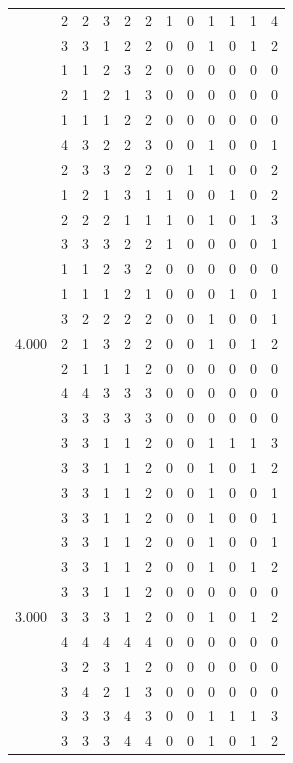 \documentclass[]{book}
\theoremstyle{definition}
\theoremstyle{definition}
\theoremstyle{definition}
\theoremstyle{remark}
\begin{document}
\begin{table}
{\begin{tabular}[t]{rrrrrrrrrrrr}
 & 2 & 2 & 3 & 2 & 2 & 1 & 0 & 1 & 1 & 1 & 4\\
 & 3 & 3 & 1 & 2 & 2 & 0 & 0 & 1 & 0 & 1 & 2\\
 & 1 & 1 & 2 & 3 & 2 & 0 & 0 & 0 & 0 & 0 & 0\\
 & 2 & 1 & 2 & 1 & 3 & 0 & 0 & 0 & 0 & 0 & 0\\
 & 1 & 1 & 1 & 2 & 2 & 0 & 0 & 0 & 0 & 0 & 0\\
 & 4 & 3 & 2 & 2 & 3 & 0 & 0 & 1 & 0 & 0 & 1\\
 & 2 & 3 & 3 & 2 & 2 & 0 & 1 & 1 & 0 & 0 & 2\\
 & 1 & 2 & 1 & 3 & 1 & 1 & 0 & 0 & 1 & 0 & 2\\
 & 2 & 2 & 2 & 1 & 1 & 1 & 0 & 1 & 0 & 1 & 3\\
 & 3 & 3 & 3 & 2 & 2 & 1 & 0 & 0 & 0 & 0 & 1\\
 & 1 & 1 & 2 & 3 & 2 & 0 & 0 & 0 & 0 & 0 & 0\\
 & 1 & 1 & 1 & 2 & 1 & 0 & 0 & 0 & 1 & 0 & 1\\
 & 3 & 2 & 2 & 2 & 2 & 0 & 0 & 1 & 0 & 0 & 1\\
4.000 & 2 & 1 & 3 & 2 & 2 & 0 & 0 & 1 & 0 & 1 & 2\\
 & 2 & 1 & 1 & 1 & 2 & 0 & 0 & 0 & 0 & 0 & 0\\
 & 4 & 4 & 3 & 3 & 3 & 0 & 0 & 0 & 0 & 0 & 0\\
 & 3 & 3 & 3 & 3 & 3 & 0 & 0 & 0 & 0 & 0 & 0\\
 & 3 & 3 & 1 & 1 & 2 & 0 & 0 & 1 & 1 & 1 & 3\\
 & 3 & 3 & 1 & 1 & 2 & 0 & 0 & 1 & 0 & 1 & 2\\
 & 3 & 3 & 1 & 1 & 2 & 0 & 0 & 1 & 0 & 0 & 1\\
 & 3 & 3 & 1 & 1 & 2 & 0 & 0 & 1 & 0 & 0 & 1\\
 & 3 & 3 & 1 & 1 & 2 & 0 & 0 & 1 & 0 & 0 & 1\\
 & 3 & 3 & 1 & 1 & 2 & 0 & 0 & 1 & 0 & 1 & 2\\
 & 3 & 3 & 1 & 1 & 2 & 0 & 0 & 0 & 0 & 0 & 0\\
3.000 & 3 & 3 & 3 & 1 & 2 & 0 & 0 & 1 & 0 & 1 & 2\\
 & 4 & 4 & 4 & 4 & 4 & 0 & 0 & 0 & 0 & 0 & 0\\
 & 3 & 2 & 3 & 1 & 2 & 0 & 0 & 0 & 0 & 0 & 0\\
 & 3 & 4 & 2 & 1 & 3 & 0 & 0 & 0 & 0 & 0 & 0\\
 & 3 & 3 & 3 & 4 & 3 & 0 & 0 & 1 & 1 & 1 & 3\\
 & 3 & 3 & 3 & 4 & 4 & 0 & 0 & 1 & 0 & 1 & 2\\

\end{tabular}}
\end{table}
\end{document}
